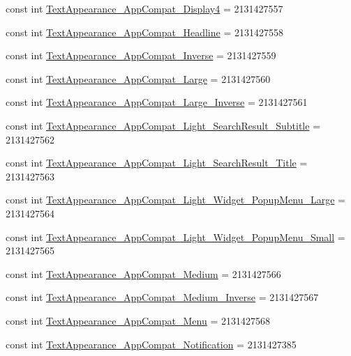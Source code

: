 \begin{CompactItemize}
\item 
const int \hyperlink{class__2doo_1_1_droid_1_1_resource_1_1_style_e45fa8b548bc6030c81795a6da3b3ed1}{TextAppearance\_\-AppCompat\_\-Display4} = 2131427557
\item 
const int \hyperlink{class__2doo_1_1_droid_1_1_resource_1_1_style_9cf174d62ebf7cfb85ae2430374c3761}{TextAppearance\_\-AppCompat\_\-Headline} = 2131427558
\item 
const int \hyperlink{class__2doo_1_1_droid_1_1_resource_1_1_style_2cd91f9c1723c4f7f5a4e4775433be98}{TextAppearance\_\-AppCompat\_\-Inverse} = 2131427559
\item 
const int \hyperlink{class__2doo_1_1_droid_1_1_resource_1_1_style_f4c569e2f6b247299dbe53712e79b4ae}{TextAppearance\_\-AppCompat\_\-Large} = 2131427560
\item 
const int \hyperlink{class__2doo_1_1_droid_1_1_resource_1_1_style_8033a72cb69a4b990bcc37795c0cabce}{TextAppearance\_\-AppCompat\_\-Large\_\-Inverse} = 2131427561
\item 
const int \hyperlink{class__2doo_1_1_droid_1_1_resource_1_1_style_04e7130b48ac920dfdaf18b5ab80e820}{TextAppearance\_\-AppCompat\_\-Light\_\-SearchResult\_\-Subtitle} = 2131427562
\item 
const int \hyperlink{class__2doo_1_1_droid_1_1_resource_1_1_style_1bd8000e49d2d6d92c5981e6e976bfdb}{TextAppearance\_\-AppCompat\_\-Light\_\-SearchResult\_\-Title} = 2131427563
\item 
const int \hyperlink{class__2doo_1_1_droid_1_1_resource_1_1_style_7a70c29e01459e266d8caa25d68dda2c}{TextAppearance\_\-AppCompat\_\-Light\_\-Widget\_\-PopupMenu\_\-Large} = 2131427564
\item 
const int \hyperlink{class__2doo_1_1_droid_1_1_resource_1_1_style_37942510a0db469c7d6057b02bc5f917}{TextAppearance\_\-AppCompat\_\-Light\_\-Widget\_\-PopupMenu\_\-Small} = 2131427565
\item 
const int \hyperlink{class__2doo_1_1_droid_1_1_resource_1_1_style_fa479696b0e8eaffb065720737b61cca}{TextAppearance\_\-AppCompat\_\-Medium} = 2131427566
\item 
const int \hyperlink{class__2doo_1_1_droid_1_1_resource_1_1_style_5e1458bb5c8b102c2714706a2c4e648b}{TextAppearance\_\-AppCompat\_\-Medium\_\-Inverse} = 2131427567
\item 
const int \hyperlink{class__2doo_1_1_droid_1_1_resource_1_1_style_5c75a59c918df32f9c7e0c464ffbb221}{TextAppearance\_\-AppCompat\_\-Menu} = 2131427568
\item 
const int \hyperlink{class__2doo_1_1_droid_1_1_resource_1_1_style_c2ce1f5a581f2529739eeb4e79c2f4c4}{TextAppearance\_\-AppCompat\_\-Notification} = 2131427385

\end{CompactItemize}
